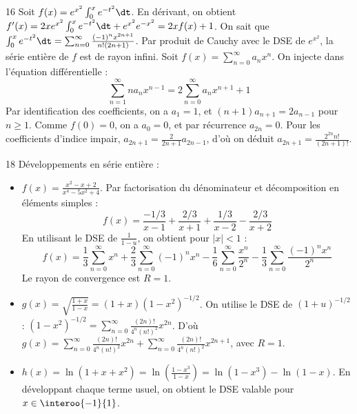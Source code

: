 \begin{correction}{16}
Soit $f(x) = e^{x^2} \int_0^x e^{-t^2} \dt$. 
En dérivant, on obtient $f'(x) = 2x e^{x^2} \int_0^x e^{-t^2} \dt + e^{x^2}e^{-x^2} = 2x f(x) + 1$. 
On sait que $\int_0^x e^{-t^2} \dt = \sum_{n=0}^\infty \frac{(-1)^n x^{2n+1}}{n!(2n+1)}$. 
Par produit de Cauchy avec le DSE de $e^{x^2}$, la série entière de $f$ est de rayon infini. 
Soit $f(x) = \sum_{n=0}^\infty a_n x^n$. On injecte dans l'équation différentielle : 
$$ \sum_{n=1}^\infty n a_n x^{n-1} = 2 \sum_{n=0}^\infty a_n x^{n+1} + 1 $$ 
Par identification des coefficients, on a $a_1 = 1$, et $(n+1)a_{n+1} = 2a_{n-1}$ pour $n \ge 1$. 
Comme $f(0)=0$, on a $a_0 = 0$, et par récurrence $a_{2n}=0$. 
Pour les coefficients d'indice impair, $a_{2n+1} = \frac{2}{2n+1} a_{2n-1}$, d'où on déduit $a_{2n+1} = \frac{2^{2n} n!}{(2n+1)!}$. 
\end{correction}

\begin{correction}{18}
Développements en série entière :
\begin{itemize}
 \item $f(x) = \frac{x^2-x+2}{x^4-5x^2+4}$. Par factorisation du dénominateur et décomposition en éléments simples : 
 $$ f(x) = \frac{-1/3}{x-1} + \frac{2/3}{x+1} + \frac{1/3}{x-2} - \frac{2/3}{x+2} $$ 
 En utilisant le DSE de $\frac{1}{1-u}$, on obtient pour $|x|<1$ : 
 $$ f(x) = \frac{1}{3} \sum_{n=0}^\infty x^n + \frac{2}{3} \sum_{n=0}^\infty (-1)^n x^n - \frac{1}{6} \sum_{n=0}^\infty \frac{x^n}{2^n} - \frac{1}{3} \sum_{n=0}^\infty \frac{(-1)^n x^n}{2^n} $$ 
 Le rayon de convergence est $R=1$. 
 \item $g(x) = \sqrt{\frac{1+x}{1-x}} = (1+x)(1-x^2)^{-1/2}$. 
 On utilise le DSE de $(1+u)^{-1/2}$ : $(1-x^2)^{-1/2} = \sum_{n=0}^\infty \frac{(2n)!}{4^n (n!)^2} x^{2n}$. 
 D'où $g(x) = \sum_{n=0}^\infty \frac{(2n)!}{4^n (n!)^2} x^{2n} + \sum_{n=0}^\infty \frac{(2n)!}{4^n (n!)^2} x^{2n+1}$, avec $R=1$. 
 \item $h(x) = \ln(1+x+x^2) = \ln\left(\frac{1-x^3}{1-x}\right) = \ln(1-x^3) - \ln(1-x)$. 
 En développant chaque terme usuel, on obtient le DSE valable pour $x \in \interoo{-1}{1}$. 
\end{itemize}
\end{correction}

